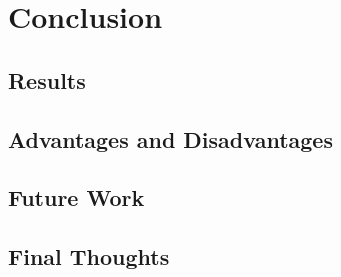\chapter{Conclusion}

\section{Results}

\section{Advantages and Disadvantages}

\section{Future Work}

\section{Final Thoughts}